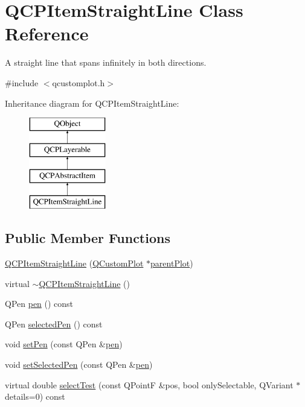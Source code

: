 \hypertarget{class_q_c_p_item_straight_line}{}\section{Q\+C\+P\+Item\+Straight\+Line Class Reference}
\label{class_q_c_p_item_straight_line}


A straight line that spans infinitely in both directions.  




{\ttfamily \#include $<$qcustomplot.\+h$>$}

Inheritance diagram for Q\+C\+P\+Item\+Straight\+Line\+:\begin{figure}[H]
\begin{center}
\leavevmode
\includegraphics[height=4.000000cm]{class_q_c_p_item_straight_line}
\end{center}
\end{figure}
\subsection*{Public Member Functions}
\begin{DoxyCompactItemize}
\item 
\hyperlink{class_q_c_p_item_straight_line_a41fd2e1f006983449eca9830930c3b10}{Q\+C\+P\+Item\+Straight\+Line} (\hyperlink{class_q_custom_plot}{Q\+Custom\+Plot} $\ast$\hyperlink{class_q_c_p_layerable_ab7e0e94461566093d36ffc0f5312b109}{parent\+Plot})
\item 
virtual \hyperlink{class_q_c_p_item_straight_line_a1f0730759916ce203baeaad1ad2af3ea}{$\sim$\+Q\+C\+P\+Item\+Straight\+Line} ()
\item 
Q\+Pen \hyperlink{class_q_c_p_item_straight_line_ad858ab1a444391aab778f765453ea222}{pen} () const 
\item 
Q\+Pen \hyperlink{class_q_c_p_item_straight_line_a9e33ae966a7e2ea1083b3b9aeabeaea5}{selected\+Pen} () const 
\item 
void \hyperlink{class_q_c_p_item_straight_line_a9f36c9c9e60d7d9ac084c80380ac8601}{set\+Pen} (const Q\+Pen \&\hyperlink{class_q_c_p_item_straight_line_ad858ab1a444391aab778f765453ea222}{pen})
\item 
void \hyperlink{class_q_c_p_item_straight_line_a5c33559498d33543fa95cf0a36e851ff}{set\+Selected\+Pen} (const Q\+Pen \&\hyperlink{class_q_c_p_item_straight_line_ad858ab1a444391aab778f765453ea222}{pen})
\item 
virtual double \hyperlink{class_q_c_p_item_straight_line_a64cc3796f58ce856012732603edb2f1c}{select\+Test} (const Q\+Point\+F \&pos, bool only\+Selectable, Q\+Variant $\ast$details=0) const 
\end{DoxyCompactItemize}

